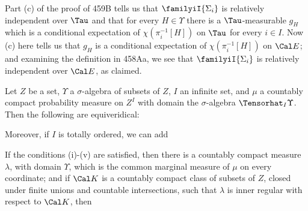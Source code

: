 {Part (c) of the proof of 459B tells us that $\familyiI{\Sigma_i}$ is
relatively independent over $\Tau$ and that for every $H\in\Upsilon$
there is a $\Tau$-measurable $g_H$ which is a conditional expectation of
$\chi(\pi_i^{-1}[H])$ on $\Tau$ for every $i\in I$.   Now (c) here tells
us that $g_H$ is a conditional expectation of $\chi(\pi_i^{-1}[H])$ on
$\Cal E$;  and examining the definition in 458Aa, we see that
$\familyiI{\Sigma_i}$ is relatively independent over $\Cal E$, as
claimed.
}%

 Let $Z$ be a set, $\Upsilon$ a
$\sigma$-algebra of subsets of $Z$, $I$ an infinite set, and $\mu$ a
countably compact probability measure on $Z^I$ with domain the
$\sigma$-algebra $\Tensorhat_I\Upsilon$.   Then the following are equiveridical:


\noindent Moreover, if $I$ is totally ordered, we can add


\noindent If the conditions (i)-(v) are satisfied, then there is a
countably compact measure $\lambda$, with domain $\Upsilon$, which is
the common marginal measure of $\mu$ on every coordinate;  and
if $\Cal K$ is a countably compact class of subsets of $Z$, closed under
finite unions and countable intersections, such that $\lambda$ is inner
regular with respect to $\Cal K$, then

